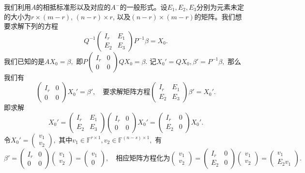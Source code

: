 我们利用$A$的相抵标准形以及对应的$A^-$的一般形式。设$E_1, E_2, E_3$分别为元素未定的大小为$r \times (m-r)$, $(n-r) \times r$, 以及$(n-r) \times (m-r)$的矩阵。我们想要求解下列的方程
$$Q^{-1} \begin{pmatrix} I_r & E_1 \\ E_2 & E_3 \end{pmatrix} P^{-1} \beta = X_0.$$
我们已知的是$AX_0 = \beta,$ 即$P \begin{pmatrix} I_r & 0 \\ 0 & 0 \end{pmatrix} Q X_0 = \beta.$ 记$X_0' = QX_0, \beta' = P^{-1}\beta,$ 那么我们有
$$\begin{pmatrix} I_r & 0 \\ 0 & 0 \end{pmatrix} X_0' = \beta', \quad \text{要求解矩阵方程} \begin{pmatrix} I_r & E_1 \\ E_2 & E_3 \end{pmatrix} \beta' = X_0'.$$
即求解
$$X_0' = \begin{pmatrix} I_r & E_1 \\ E_2 & E_3 \end{pmatrix} \begin{pmatrix} I_r & 0 \\ 0 & 0 \end{pmatrix} X_0' = \begin{pmatrix} I_r & 0 \\ E_2 & 0 \end{pmatrix} X_0'.$$
令$X_0' = \begin{pmatrix} v_1 \\ v_2 \end{pmatrix},$ 其中$v_1 \in \mathbb{F}^{r \times 1}, v_2 \in \mathbb{F}^{(n-s)\times 1},$ 有
$$\beta' = \begin{pmatrix} I_r & 0 \\ 0 & 0 \end{pmatrix} \begin{pmatrix} v_1 \\ v_2 \end{pmatrix} = \begin{pmatrix} v_1 \\ 0 \end{pmatrix}, \quad \text{相应矩阵方程化为} \begin{pmatrix} v_1 \\ v_2 \end{pmatrix} = \begin{pmatrix} I_r & 0 \\ E_2 & 0 \end{pmatrix} \begin{pmatrix} v_1 \\ v_2 \end{pmatrix} = \begin{pmatrix} v_1 \\ E_2v_1 \end{pmatrix}.$$
